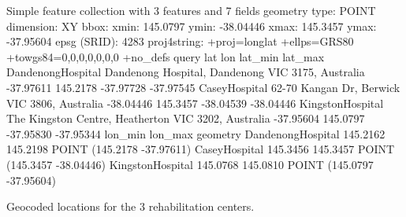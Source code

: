 \documentclass[utf8]{frontiersHLTH}
\begin{document}
\begin{table}[h]
\begin{verbnobox}[\fontsize{8pt}{8pt}\selectfont]
Simple feature collection with 3 features and 7 fields
geometry type:  POINT
dimension:      XY
bbox:           xmin: 145.0797 ymin: -38.04446 xmax: 145.3457 ymax: -37.95604
epsg (SRID):    4283
proj4string:    +proj=longlat +ellps=GRS80 +towgs84=0,0,0,0,0,0,0 +no_defs
                                                                query       lat      lon   lat_min   lat_max
DandenongHospital   Dandenong Hospital, Dandenong VIC 3175, Australia -37.97611 145.2178 -37.97728 -37.97545
CaseyHospital            62-70 Kangan Dr, Berwick VIC 3806, Australia -38.04446 145.3457 -38.04539 -38.04446
KingstonHospital  The Kingston Centre, Heatherton VIC 3202, Australia -37.95604 145.0797 -37.95830 -37.95344
                   lon_min  lon_max                   geometry
DandenongHospital 145.2162 145.2198 POINT (145.2178 -37.97611)
CaseyHospital     145.3456 145.3457 POINT (145.3457 -38.04446)
KingstonHospital  145.0768 145.0810 POINT (145.0797 -37.95604)
\end{verbnobox}
\caption{Geocoded locations for the 3 rehabilitation centers.\label{tab:georehab}}
\end{table}
\end{document}
